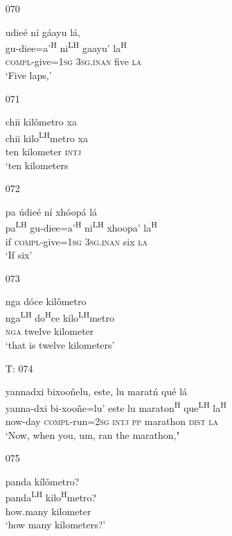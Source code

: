 \begin{itemize}
\item[070]
 
\glll   udie\'{e} n\'{i} g\'{a}ayu l\'{a}, \\ 
 gu-diee=a'\textsuperscript{H} ni\textsuperscript{LH} gaayu' la\textsuperscript{H} \\
 \textsc{compl}-give=\textsc{1sg} \textsc{3sg.inan} five \textsc{la} \\
\glt `Five laps,'
 

\item[071]
 
\glll   chii kil\v{o}metro xa \\
chii kilo\textsuperscript{LH}metro xa \\
 ten kilometer \textsc{intj} \\
\glt `ten kilometers
 

\item[072]
 
\glll   pa \'{u}die\'{e} n\'{i} xh\'{o}op\'{a} l\'{a} \\
pa\textsuperscript{LH} gu-diee=a'\textsuperscript{H} ni\textsuperscript{LH} xhoopa' la\textsuperscript{H} \\
 if \textsc{compl}-give=\textsc{1sg} \textsc{3sg.inan} six \textsc{la} \\
\glt `If six'
 

\item[073]
 
\glll  nga d\'{o}ce kil\v{o}metro \\
nga\textsuperscript{LH} do\textsuperscript{H}ce kilo\textsuperscript{LH}metro \\
 \textsc{nga} twelve kilometer \\
\glt `that is twelve kilometers'
 

\item[T: 074]
 
\glll   yannadxi bixoo\~{n}elu, este, lu marat\'{n} qu\'{e} l\'{a} \\
 yanna-dxi bi-xoo\~{n}e=lu' este lu maraton\textsuperscript{H} que\textsuperscript{LH} la\textsuperscript{H} \\
 now-day \textsc{compl}-run=\textsc{2sg} \textsc{intj} \textsc{pp} marathon \textsc{dist} \textsc{la} \\
\glt `Now, when you, um, ran the marathon,"
 

\item[075]
 
\glll   panda k\'{i}l\v{o}metro? \\
panda\textsuperscript{LH} kilo\textsuperscript{H}metro? \\
 how.many kilometer \\
\glt `how many kilometers?'
 



\end{itemize}
